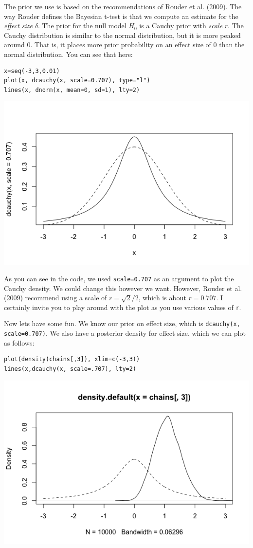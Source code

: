 \documentclass[11pt]{article}
\begin{document}
The prior we use is based on the recommendations of Rouder et al. (2009). The way Rouder defines the Bayesian t-test is that we compute an estimate for the \emph{effect size} $\delta$.  The prior for the null model $H_0$ is a Cauchy prior with \emph{scale} $r$.  The Cauchy distribution is similar to the normal distribution, but it is more peaked around 0.  That is, it places more prior probability on an effect size of 0 than the normal distribution.  You can see that here:

\begin{verbatim}
x=seq(-3,3,0.01)
plot(x, dcauchy(x, scale=0.707), type="l")
lines(x, dnorm(x, mean=0, sd=1), lty=2)
\end{verbatim}

\includegraphics[width=.9\linewidth]{figures/week14/cauchy.png}

As you can see in the code, we used \texttt{scale=0.707} as an argument to plot the Cauchy density.  We could change this however we want.  However, Rouder et al. (2009) recommend using a scale of $r=\sqrt{2}/2$, which is about $r=0.707$.  I certainly invite you to play around with the plot as you use various values of \texttt{r}.

Now lets have some fun.  We know our prior on effect size, which is \texttt{dcauchy(x, scale=0.707)}.  We also have a posterior density for effect size, which we can plot as follows:

\begin{verbatim}
plot(density(chains[,3]), xlim=c(-3,3))
lines(x,dcauchy(x, scale=.707), lty=2)
\end{verbatim}

\includegraphics[width=.9\linewidth]{figures/week14/priorPosterior.png}
\end{document}
